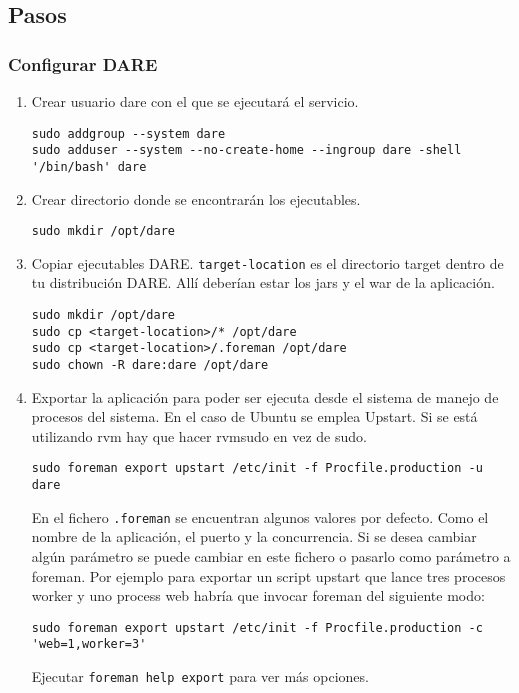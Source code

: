 \subsection{Pasos}

\subsubsection{Configurar DARE}
\begin{enumerate}
  \item Crear usuario dare con el que se ejecutará el servicio.
    \begin{verbatim}
sudo addgroup --system dare
sudo adduser --system --no-create-home --ingroup dare -shell '/bin/bash' dare
    \end{verbatim}
  \item Crear directorio donde se encontrarán los ejecutables.
    \begin{verbatim}
sudo mkdir /opt/dare
    \end{verbatim}
  \item Copiar ejecutables DARE. \verb+target-location+ es el
    directorio target dentro de tu distribución DARE. Allí deberían
    estar los jars y el war de la aplicación.
    \begin{verbatim}
sudo mkdir /opt/dare
sudo cp <target-location>/* /opt/dare
sudo cp <target-location>/.foreman /opt/dare
sudo chown -R dare:dare /opt/dare
    \end{verbatim}

  \item Exportar la aplicación para poder ser ejecuta desde el sistema
    de manejo de procesos del sistema. En el caso de Ubuntu se emplea
    Upstart. Si se está utilizando rvm hay que hacer
    rvmsudo en vez de sudo.

    \verb+sudo foreman export upstart /etc/init -f Procfile.production -u dare+

    En el fichero \verb+.foreman+ se encuentran algunos valores por
    defecto. Como el nombre de la aplicación, el puerto y la
    concurrencia. Si se desea cambiar algún parámetro se puede cambiar
    en este fichero o pasarlo como parámetro a foreman. Por ejemplo
    para exportar un script upstart que lance tres procesos worker y
    uno process web habría que invocar foreman del siguiente modo:

    \begin{verbatim}
sudo foreman export upstart /etc/init -f Procfile.production -c 'web=1,worker=3'
    \end{verbatim}
    Ejecutar \verb+foreman help export+ para ver más opciones.
\end{enumerate}

